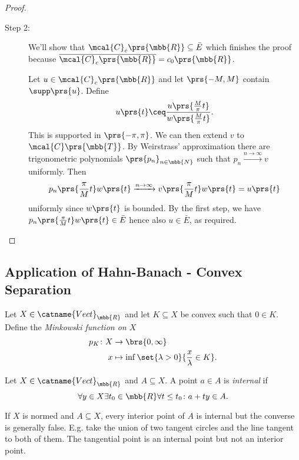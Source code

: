 \documentclass[10pt, twoside]{book}
\begin{document}
\begin{proof}
\begin{description}
\item[Step 2:]
We'll show that $\mcal{C}_c\prs{\mbb{R}} \subseteq \bar{E}$ which finishes the proof because $\overline{\mcal{C}_c\prs{\mbb{R}}} = c_0\prs{\mbb{R}}$.

Let $u \in \mcal{C}_c\prs{\mbb{R}}$ and let $\prs{-M, M}$ contain $\supp\prs{u}$. Define
\[u\prs{t} \ceq \frac{u\prs{\frac{M}{\pi} t}}{w\prs{\frac{M}{\pi} t}} \text{.}\]
This is supported in $\prs{-\pi, \pi}$.
We can then extend $v$ to $\mcal{C}\prs{\mbb{T}}$. By Weirstrass' approximation there are trigonometric polynomials $\prs{p_n}_{n \in \mbb{N}}$ such that $p_n \xrightarrow{n\to\infty} v$ uniformly.
Then
\[p_n\prs{\frac{\pi}{M} t} w\prs{t} \xrightarrow{n\to\infty} v\prs{\frac{\pi}{M} t} w\prs{t} = u\prs{t}\]
uniformly since $w\prs{t}$ is bounded.
By the first step, we have $p_n\prs{\frac{\pi}{M} t} w\prs{t} \in \bar{E}$ hence also $u \in \bar{E}$, as required.
\end{description}
\end{proof}

\subsection{Application of Hahn-Banach - Convex Separation}

\begin{definition}
Let $X \in \catname{Vect}_{\mbb{R}}$ and let $K \subseteq X$ be convex such that $0 \in K$.
Define the \emph{Minkowski function on $X$}
\begin{align*}
p_K \colon X &\to \brs{0, \infty} \\
x &\mapsto \inf\set{\lambda > 0}{\frac{x}{\lambda} \in K} \text{.}
\end{align*}
\end{definition}

\begin{definition}
Let $X \in \catname{Vect}_{\mbb{R}}$ and $A \subseteq X$. A point $a \in A$ is \emph{internal} if
\[\forall y \in X \exists t_0 \in \mbb{R} \forall t \leq t_0 \colon a + ty \in A \text{.}\]
\end{definition}

\begin{remark}
If $X$ is normed and $A \subseteq X$, every interior point of $A$ is internal but the converse is generally false. E.g. take the union of two tangent circles and the line tangent to both of them. The tangential point is an internal point but not an interior point.
\end{remark}
\end{document}
